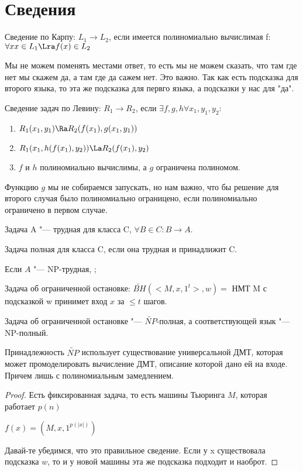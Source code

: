 ﻿\section{Сведения}
\begin{Def}
Сведение по Карпу: $L_1  \to L_2$, если 
имеется полиномиально вычислимая f:
$\forall x x \in L_1 \Lra f(x) \in L_2$
\end{Def}

Мы не можем поменять местами ответ, то есть мы не можем сказать,
что там где нет мы скажем да, а там где да сажем нет. Это важно. 
Так как есть подсказка для второго языка, то эта же 
подсказка для первго языка, а подсказки у нас для "да".

\begin{Def}
Сведение задач по Левину: $R_1 \to R_2$, если $\exists f, g, h \forall x_1, y_1, y_2:$
\begin{enumerate}
    \item $R_1(x_1, y_1) \Ra R_2(f(x_1), g(x_1, y_1))$
    \item $R_1(x_1, h(f(x_1), y_2)) \La R_2(f(x_1), y_2)$
    \item $f$ и $h$ полиномиально вычислимы, а $g$ ограничена полиномом. 
\end{enumerate}
\end{Def}

Функцию $g$ мы не собираемся запускать, но нам важно, что бы решение для второго случая 
было полиномиально ограницено, если полиномиально ограничено в первом случае.  
\begin{Def}
Задача A "--- трудная для класса C, $\forall B \in C \colon B \to A$.
\end{Def}
\begin{Def}
Задача полная для класса C, если она трудная и принадлижит C.
\end{Def}
\begin{theorem}
Если $A$ "--- NP-трудная, ;
\end{theorem}


\begin{exmp}
Задача об ограниченной остановке:
$\tilde{BH}(<M, x, 1^t>, w) =$ НМТ
M с подсказкой w принимет вход $x$ за $\le t$ шагов.
\end{exmp}
\begin{theorem}
Задача об ограниченной остановке "--- $\tilde{NP}$-полная, 
а соответствующей язык "--- NP-полный. 
\end{theorem}
\begin{Rem}
Принадлежность $\tilde{NP}$ использует 
существование универсальной ДМТ, которая 
может промоделировать вычисление ДМТ, описание
которой дано ей на входе. Причем лишь с полиномиальным замедлением. 
\end{Rem}
\begin{proof}
Есть фиксированная задача, то есть 
машины Тьюринга $M$, которая работает $p(n)$

$f(x) = (M, x, 1^{p(|x|)})$

Давай-те убедимся, что это правильное сведение. Если 
у x существовала подсказка $w$, то и у новой машины
эта же подсказка подходит и наоброт. 
\end{proof}

